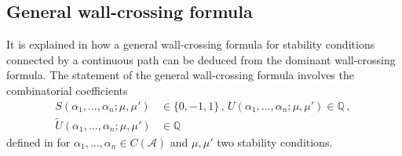 \documentclass[12pt]{amsart}
\theoremstyle{definition}
\newcommand{\BQ}{{\mathbb{Q}}}
\newcommand{\CA}{{\mathcal A}}
\newcommand{\1}{\mathbf 1}
\begin{document}
\subsection{General wall-crossing formula}\label{subsec: generalWC}

It is explained in \cite[Section 11]{joyce} how a general wall-crossing formula for stability conditions connected by a continuous path can be deduced from the dominant wall-crossing formula. The statement of the general wall-crossing formula involves the combinatorial coefficients
\begin{align*}
    S(\alpha_1, \ldots, \alpha_n; \mu, \mu')&\in \{0, -1, 1\}\,,\, U(\alpha_1, \ldots, \alpha_n; \mu, \mu')\in \BQ\,,\,\\
    \tilde U(\alpha_1, \ldots, \alpha_n; \mu, \mu')&\in \BQ
    \end{align*}
defined in \cite[Section 4]{JO06IV} for $\alpha_1, \ldots, \alpha_n\in C(\CA)$ and $\mu,\mu'$ two stability conditions. 
\end{document}
